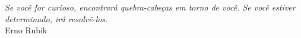 
\chapter*{}
\vspace{15cm}
\begin{flushright}
	\textit
	{
		Se você for curioso, encontrará quebra-cabeças em torno de você. Se você estiver determinado, irá resolvê-los.
	}\medskip\\ 
	Erno Rubik
\end{flushright}